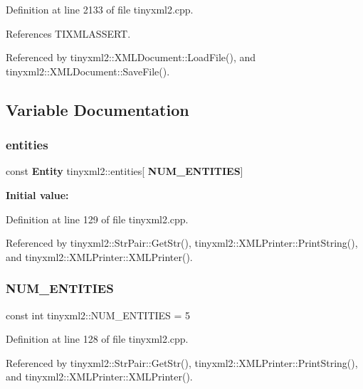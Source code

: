 Definition at line 2133 of file tinyxml2.\+cpp.



References T\+I\+X\+M\+L\+A\+S\+S\+E\+RT.



Referenced by tinyxml2\+::\+X\+M\+L\+Document\+::\+Load\+File(), and tinyxml2\+::\+X\+M\+L\+Document\+::\+Save\+File().



\subsection{Variable Documentation}
\mbox{\label{namespacetinyxml2_ae132483871eeb55d7b5ddda3d2396e81}} 
\subsubsection{entities}
{\footnotesize\ttfamily const \textbf{ Entity} tinyxml2\+::entities[\textbf{ N\+U\+M\+\_\+\+E\+N\+T\+I\+T\+I\+ES}]\hspace{0.3cm}{\ttfamily [static]}}

{\bfseries Initial value\+:}
\begin{DoxyCode}{0}
\DoxyCodeLine{= \{}
\DoxyCodeLine{\}}

\end{DoxyCode}


Definition at line 129 of file tinyxml2.\+cpp.



Referenced by tinyxml2\+::\+Str\+Pair\+::\+Get\+Str(), tinyxml2\+::\+X\+M\+L\+Printer\+::\+Print\+String(), and tinyxml2\+::\+X\+M\+L\+Printer\+::\+X\+M\+L\+Printer().

\mbox{\label{namespacetinyxml2_aef74bfad4850ed3181f00f86b03c7b45}} 
\subsubsection{NUM\_ENTITIES}
{\footnotesize\ttfamily const int tinyxml2\+::\+N\+U\+M\+\_\+\+E\+N\+T\+I\+T\+I\+ES = 5\hspace{0.3cm}{\ttfamily [static]}}



Definition at line 128 of file tinyxml2.\+cpp.



Referenced by tinyxml2\+::\+Str\+Pair\+::\+Get\+Str(), tinyxml2\+::\+X\+M\+L\+Printer\+::\+Print\+String(), and tinyxml2\+::\+X\+M\+L\+Printer\+::\+X\+M\+L\+Printer().

